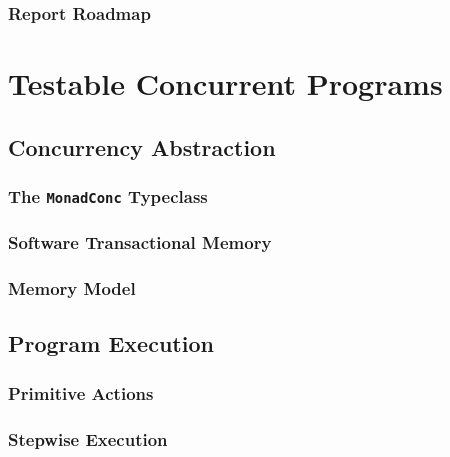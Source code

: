 \documentclass[openright, dottedtoc, headinclude, footinclude=true, a4paper, numbers=noenddot, fontsize=10pt]{scrreprt}
\begin{document}
  \section{Report Roadmap}
  \label{sec:intro-roadmap}
  

\part{Testable Concurrent Programs}
\label{part:testable}

\null\clearpage
\chapter{Concurrency Abstraction}
\label{chap:abstraction}


  \section{The \texttt{MonadConc} Typeclass}
  \label{sec:abstraction-typeclass}
  

  \section{Software Transactional Memory}
  \label{sec:abstraction-stm}
  

  \section{Memory Model}
  \label{sec:abstraction-mem}
  

\null\clearpage
\chapter{Program Execution}
\label{chap:execution}


  \section{Primitive Actions}
  \label{sec:execution-primops}
  

  \section{Stepwise Execution}
  \label{sec:execution-stepwise}
  
\end{document}
